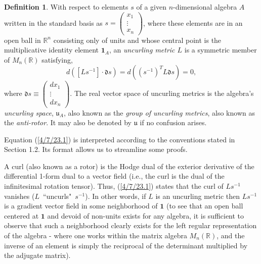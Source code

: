 \documentclass{amsart}
\numberwithin{equation}{section}
\theoremstyle{definition}
\newtheorem{definition}[theorem]{Definition}
\numberwithin{theorem}{section}
\begin{document}
   \enlargethispage{1.5cm}
     \begin{definition}\label{7/21/23.1} With respect to elements $s$ of a given $n$-dimensional algebra $A$ written in the standard basis as $s= \left(\begin{array}{ccc}
x_1   \\ 
\vdots \\
x_n   
\end{array}\right)$, where these elements are in an open ball in $\mathbb{R}^n$ consisting only of units and whose central point is the multiplicative identity element $\mathbf{1}_A$, an {\it uncurling metric $L$} is a symmetric member of $M_n(\mathbb{R})$  satisfying, \begin{equation}\label{4/7/23.1} d([Ls^{-1}]\cdot \mathfrak{d}s) = d\left((s^{-1})^T L \mathfrak{d}s\right) = 0, \end{equation} where $\mathfrak{d}s \equiv \left(\begin{array}{ccc}
dx_1   \\ 
\vdots \\
dx_n   
\end{array}\right)$.  The real vector space of uncurling metrics is the algebra's {\it uncurling space}, $\mathfrak{u}_A$, also known as the {\it group of uncurling metrics}, also known as the {\it anti-rotor}.  It may also be denoted by $\mathfrak{u}$ if no confusion arises.    \end{definition}

\bigskip

Equation (\ref{4/7/23.1}) is interpreted according to the conventions stated in Section 1.2.  Its format allows us to streamline some proofs.

 A curl (also known as a rotor) is the Hodge dual of the exterior derivative of the differential \mbox{1-form} dual to a vector field (i.e., the curl is the dual of the infinitesimal rotation tensor).  Thus,  (\ref{4/7/23.1}) states that the curl of $Ls^{-1}$ vanishes (\mbox{$L$ ``uncurls" $s^{-1}$}).    In other words, if $L$ is an uncurling metric then $Ls^{-1}$ is a gradient vector field in some neighborhood of $\mathbf{1}$ (to see that an open ball centered at $\mathbf{1}$ and devoid of non-units exists for any algebra, it is sufficient to observe that such a neighborhood clearly exists for the left regular representation of the algebra - where one works within the matrix algebra $ M_n(\mathbb{R})$, and the inverse of an element is simply the reciprocal of the determinant multiplied by the adjugate matrix).
 
\end{document}

